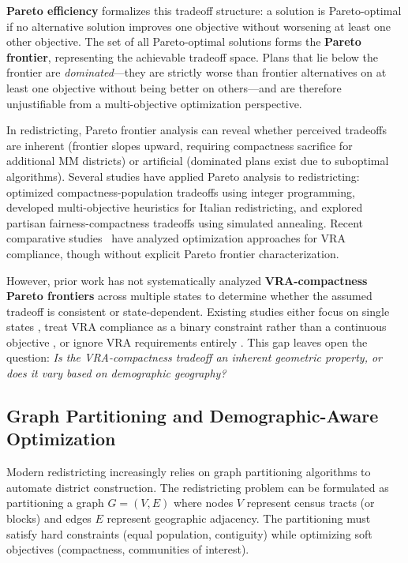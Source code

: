 \textbf{Pareto efficiency} formalizes this tradeoff structure: a solution is Pareto-optimal if no alternative solution improves one objective without worsening at least one other objective. The set of all Pareto-optimal solutions forms the \textbf{Pareto frontier}, representing the achievable tradeoff space. Plans that lie below the frontier are \emph{dominated}---they are strictly worse than frontier alternatives on at least one objective without being better on others---and are therefore unjustifiable from a multi-objective optimization perspective.

In redistricting, Pareto frontier analysis can reveal whether perceived tradeoffs are inherent (frontier slopes upward, requiring compactness sacrifice for additional MM districts) or artificial (dominated plans exist due to suboptimal algorithms). Several studies have applied Pareto analysis to redistricting: \citet{mehrotra1998} optimized compactness-population tradeoffs using integer programming, \citet{ricca2013} developed multi-objective heuristics for Italian redistricting, and \citet{king2022} explored partisan fairness-compactness tradeoffs using simulated annealing. Recent comparative studies~\citep{dellaLibera2026multiVsEdge, dellaLibera2026nwayRecursive} have analyzed optimization approaches for VRA compliance, though without explicit Pareto frontier characterization.

However, prior work has not systematically analyzed \textbf{VRA-compactness Pareto frontiers} across multiple states to determine whether the assumed tradeoff is consistent or state-dependent. Existing studies either focus on single states \citep{mccartan2020}, treat VRA compliance as a binary constraint rather than a continuous objective \citep{deford2021}, or ignore VRA requirements entirely \citep{levin2020}. This gap leaves open the question: \emph{Is the VRA-compactness tradeoff an inherent geometric property, or does it vary based on demographic geography?}

\subsection{Graph Partitioning and Demographic-Aware Optimization}

Modern redistricting increasingly relies on graph partitioning algorithms to automate district construction. The redistricting problem can be formulated as partitioning a graph $G = (V, E)$ where nodes $V$ represent census tracts (or blocks) and edges $E$ represent geographic adjacency. The partitioning must satisfy hard constraints (equal population, contiguity) while optimizing soft objectives (compactness, communities of interest).

